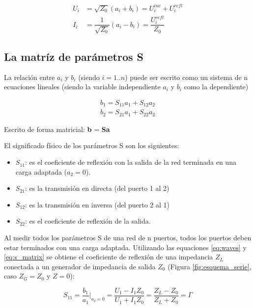 \begin{equation}
\begin{aligned}
	U_i &= \sqrt{Z_0}(a_i + b_i) = U_i^{inc} + U_i^{refl}\\
	I_i &= \dfrac{1}{\sqrt{Z_0}}(a_i - b_i) = \dfrac{U_i^{refl}}{Z_0}
\end{aligned}
\end{equation}


\subsection{La matríz de parámetros S}

La relación entre $a_i$ y $b_i$ (siendo $i=1..n$) puede ser escrito como un sistema de n ecuaciones lineales (siendo la variable
independiente $a_i$ y $b_i$ como la dependiente)

\begin{equation}
\begin{aligned}
	b_1 = S_{11}a_1 + S_{12}a_2 \\
	b_2 = S_{21}a_1 + S_{22}a_2
\end{aligned}
\label{eq:s_matrix}
\end{equation}

Escrito de forma matricial: \textbf{b} = \textbf{Sa}

El significado físico de los parámetros S son los siguientes:
\begin{itemize}
	\item $S_{11}$: es el coeficiente de reflexión con la salida de la red terminada en una carga adaptada ($a_2 = 0$).
	\item $S_{21}$: es la transmisión en directa (del puerto 1 al 2)
	\item $S_{12}$: es la transmisión en inversa (del puerto 2 al 1)
	\item $S_{22}$: es el coeficiente de reflexión de la salida.
\end{itemize}

Al medir todos los parámetros S de una red de n puertos, todos los puertos deben estar terminados con una carga adaptada.
Utilizando las equaciones \ref{eq:waves} y \ref{eq:s_matrix} se obtiene el coeficiente de reflexión de una impedancia $Z_L$
conectada a un generador de impedancia de salida $Z_0$ (Figura \ref{fig:esquema_serie}, caso $Z_G = Z_0$ y $Z = 0$):

\begin{equation}
S_{11} = \dfrac{b_1}{a_1}\bigg|_{a_2=0} = \dfrac{U_1 - I_1Z_0}{U_1 + I_1Z_0} = \dfrac{Z_L - Z_0}{Z_L + Z_0} = \Gamma
\end{equation}


